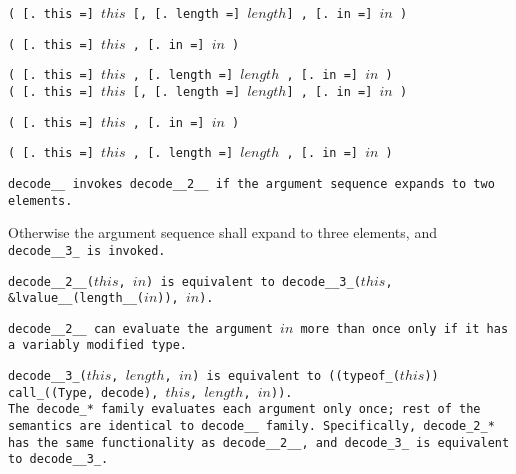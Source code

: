 
\s\s\s\s\tt{(} [\tt{. this =}] $this$ [\tt{,}
[\tt{. length =}] $length$] \tt{,} [\tt{. in =}] $in$ \tt{)}

\s\tt{(} [\tt{. this =}] $this$
\phantom{[}\tt{,} [\tt{. in =}] $in$ \tt{)}

\s\s\tt{(} [\tt{. this =}] $this$ \phantom{[}\tt{,}
[\tt{. length =}] $length$\phantom{]} \tt{,} [\tt{. in =}] $in$ \tt{)}\\

\s\s\s\s\s\tt{(} [\tt{. this =}] $this$ [\tt{,}
[\tt{. length =}] $length$] \tt{,} [\tt{. in =}] $in$ \tt{)}

\s\s\s\tt{(} [\tt{. this =}] $this$
\phantom{[}\tt{,} [\tt{. in =}] $in$ \tt{)}

\s\s\s\tt{(} [\tt{. this =}] $this$ \phantom{[}\tt{,}
[\tt{. length =}] $length$\phantom{]} \tt{,} [\tt{. in =}] $in$ \tt{)}


\tt{decode__} invokes \tt{decode__2__} if the
argument sequence expands to two elements.

Otherwise the argument sequence shall expand to
three elements, and \tt{decode__3_} is invoked.

\tt{decode__2__(}$this$\tt{,} $in$\tt{)} is equivalent to
\tt{decode__3_(}$this$\tt{, &lvalue__(length__(}$in$\tt{)),} $in$\tt{)}.

\tt{decode__2__} can evaluate the argument $in$ more
than once only if it has a variably modified type.

\tt{decode__3_(}$this$\tt{,} $length$\tt{,} $in$\tt{)}
is equivalent to \tt{((typeof_(}$this$\tt{))
call_((Type, decode),} $this$\tt{,} $length$\tt{,} $in$\tt{))}.\\

The \tt{decode_}* family evaluates each argument only once;
rest of the semantics are identical to \tt{decode__} family.
Specifically, \tt{decode_2_}* has the same functionality as \tt{decode__2__},
and \tt{decode_3_} is equivalent to \tt{decode__3_}.
